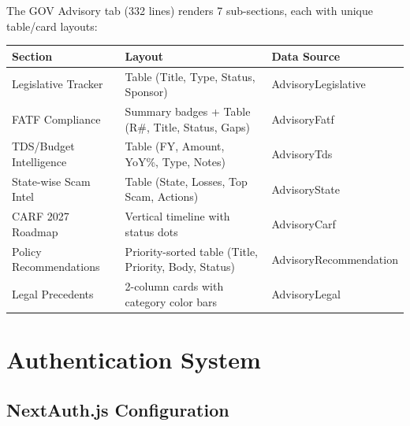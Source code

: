 \documentclass[12pt,a4paper]{article}
\begin{document}
The GOV Advisory tab (332 lines) renders 7 sub-sections, each with unique table/card layouts:

\begin{center}
\begin{tabular}{lll}
\toprule
\textbf{Section} & \textbf{Layout} & \textbf{Data Source} \\
\midrule
Legislative Tracker & Table (Title, Type, Status, Sponsor) & AdvisoryLegislative \\
FATF Compliance & Summary badges + Table (R\#, Title, Status, Gaps) & AdvisoryFatf \\
TDS/Budget Intelligence & Table (FY, Amount, YoY\%, Type, Notes) & AdvisoryTds \\
State-wise Scam Intel & Table (State, Losses, Top Scam, Actions) & AdvisoryState \\
CARF 2027 Roadmap & Vertical timeline with status dots & AdvisoryCarf \\
Policy Recommendations & Priority-sorted table (Title, Priority, Body, Status) & AdvisoryRecommendation \\
Legal Precedents & 2-column cards with category color bars & AdvisoryLegal \\
\bottomrule
\end{tabular}
\end{center}

\newpage

\section{Authentication System}

\subsection{NextAuth.js Configuration}
\end{document}
